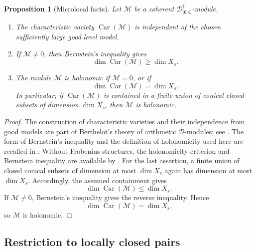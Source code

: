 \documentclass[11pt]{amsart}
\theoremstyle{plain}
\newtheorem{proposition}{Proposition}[section]
\theoremstyle{definition}
\theoremstyle{remark}
\newcommand{\Car}{\operatorname{Car}}
\begin{document}
\begin{proposition}[Microlocal facts]
\label{prop:microlocal-facts}
Let \(\mathcal M\) be a coherent
\(\mathscr D^\dagger_{\mathfrak X,\mathbb Q}\)-module.
\begin{enumerate}[label=\textup{(\roman*)}]
\item The characteristic variety \(\Car(\mathcal M)\) is independent of the
chosen sufficiently large good level model.
\item If \(\mathcal M\neq0\), then Bernstein's inequality gives
\[
  \dim\Car(\mathcal M)\geq \dim X_s.
\]
\item The module \(\mathcal M\) is holonomic if \(\mathcal M=0\), or if
\[
  \dim\Car(\mathcal M)=\dim X_s.
\]
In particular, if \(\Car(\mathcal M)\) is contained in a finite union of
conical closed subsets of dimension \(\dim X_s\), then \(\mathcal M\) is
holonomic.
\end{enumerate}
\end{proposition}

\begin{proof}
The construction of characteristic varieties and their independence from good
models are part of Berthelot's theory of arithmetic \(\mathscr D\)-modules;
see \cite[5.3.2--5.3.4]{BerthelotIntro}. The form of Bernstein's inequality
and the definition of holonomicity used here are recalled in
\cite[5.3.4--5.3.5]{BerthelotIntro}. Without Frobenius structures, the
holonomicity criterion and Bernstein inequality are available by
\cite[Th\'eor\`eme 2.2.3 and Th\'eor\`eme 2.2.8]{CaroHolonomieSansFrobenius}.
For the last assertion, a finite union of closed conical subsets of dimension
at most \(\dim X_s\) again has dimension at most \(\dim X_s\).  Accordingly, the assumed containment gives
\[
  \dim\Car(\mathcal M)\leq \dim X_s,
\]
If \(\mathcal M\neq0\), Bernstein's inequality gives the reverse inequality.
Hence
\[
  \dim\Car(\mathcal M)=\dim X_s,
\]
so \(\mathcal M\) is holonomic.
\end{proof}

\subsection{Restriction to locally closed pairs}
\label{subsec:restriction-locally-closed}
\end{document}

